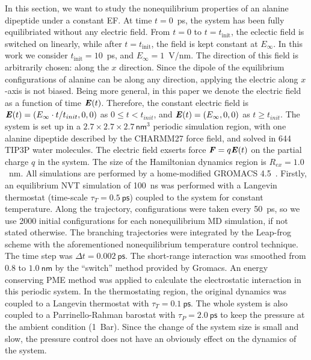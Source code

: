 \documentclass[a4paper,preprint,unsortedaddress,onecolumn]{revtex4-1}
\newcommand{\vect}[1]{\textbf{\textit{#1}}}
\begin{document}
In this section,
we want to study the nonequilibrium properties of an alanine dipeptide
under a constant EF.  At time $t=0$~ps, the system
has been fully equilibriated without any electric field. From $t=0$ to
$t=t_{\textrm{init}}$, the eclectic field is switched on linearly, while
after $t=t_{\textrm{init}}$, the field is kept constant at
$E_{\infty}$.  In this work we consider $t_{\textrm{init}} = 10$~ps,
and $E_{\infty} = 1$~V/nm.
The direction of this field is arbitrarily chosen: along the
$x$ direction. Since the dipole of the equilibrium configurations of
alanine can be along any direction, applying the electric along $x$-axis is
not biased.
Being more general, in this paper we denote the
electric field as a function of time $\vect E(t)$.
Therefore, the constant electric field is
$\vect E(t) = (E_\infty\cdot t/t_{init},0,0)$ as $0\leq t < t_{init}$, and 
$\vect E(t) = (E_\infty,0,0)$
as $t \geq t_{init}$.
The system is set up in a $2.7\times 2.7\times
2.7\, \textsf{nm}^3$ periodic simulation region, with one alanine dipeptide
described by the CHARMM27 force field, and solved in 644 TIP3P
water molecules.
The electric field exserts force $\vect F = q \vect E(t)$ on
the partial charge $q$ in the system.
The size of the  Hamiltonian dynamics region is $R_{ex} = 1.0$~nm.
All simulations are performed by a home-modified GROMACS 4.5~\cite{pronk2013gromacs}.
Firstly, an equilibrium NVT simulation of
100~\textsf{ns} was performed with a Langevin thermostat (time-scale
$\tau_T = 0.5~\textsf{ps}$) coupled to the system for constant
temperature.  Along the trajectory, configurations were taken every
50~\textsf{ps}, so we use 2000 initial configurations for each nonequilibrium
MD simulation, if not stated otherwise.
The branching trajectories were integrated by the
Leap-frog scheme with the aforementioned nonequilibrium
temperature control technique.  The
time step was $\Delta t = 0.002~\textsf{ps}$. The short-range
interaction was smoothed from $0.8$ to $1.0~\textsf{nm}$ by the
``switch'' method provided by Gromacs.  An energy conserving PME
method was applied to calculate the electrostatic interaction in this
periodic system. In the thermostating region, the original dynamics was
coupled to a Langevin thermostat with $\tau_T = 0.1~\textsf{ps}$.
The whole system is also coupled to a Parrinello-Rahman barostat with $\tau_P = 2.0~\textsf{ps}$ to keep
the pressure at the ambient condition (1~Bar). Since the
change of the system size is small and slow, the pressure control
does not have an obviously effect on the
dynamics of the system.
\end{document}
